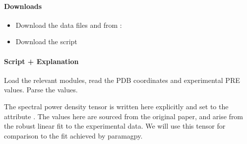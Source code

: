 \documentclass[a4paper,10pt,english,openany,oneside]{sphinxmanual}
\begin{document}
\paragraph{Downloads}
\label{\detokenize{examples/pre_fit_aniso_dipolar:downloads}}\begin{itemize}
\item {} 
Download the data files  and  from :

\item {} 
Download the script 

\end{itemize}


\paragraph{Script + Explanation}
\label{\detokenize{examples/pre_fit_aniso_dipolar:script-explanation}}
Load the relevant modules, read the PDB coordinates and experimental PRE values. Parse the values.

%
\begin{sphinxVerbatim}[commandchars=\\\{\}]
      
     
   

  
  
  
\end{sphinxVerbatim}

The spectral power density tensor is written here explicitly and set to the attribute . The values here are sourced from the original paper, and arise from the robust linear fit to the experimental data. We will use this tensor for comparison to the fit achieved by paramagpy.
\end{document}
